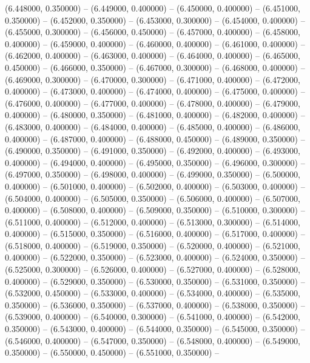 (6.448000, 0.350000) -- 
(6.449000, 0.400000) -- 
(6.450000, 0.400000) -- 
(6.451000, 0.350000) -- 
(6.452000, 0.350000) -- 
(6.453000, 0.300000) -- 
(6.454000, 0.400000) -- 
(6.455000, 0.300000) -- 
(6.456000, 0.450000) -- 
(6.457000, 0.400000) -- 
(6.458000, 0.400000) -- 
(6.459000, 0.400000) -- 
(6.460000, 0.400000) -- 
(6.461000, 0.400000) -- 
(6.462000, 0.400000) -- 
(6.463000, 0.400000) -- 
(6.464000, 0.400000) -- 
(6.465000, 0.450000) -- 
(6.466000, 0.350000) -- 
(6.467000, 0.300000) -- 
(6.468000, 0.400000) -- 
(6.469000, 0.300000) -- 
(6.470000, 0.300000) -- 
(6.471000, 0.400000) -- 
(6.472000, 0.400000) -- 
(6.473000, 0.400000) -- 
(6.474000, 0.400000) -- 
(6.475000, 0.400000) -- 
(6.476000, 0.400000) -- 
(6.477000, 0.400000) -- 
(6.478000, 0.400000) -- 
(6.479000, 0.400000) -- 
(6.480000, 0.350000) -- 
(6.481000, 0.400000) -- 
(6.482000, 0.400000) -- 
(6.483000, 0.400000) -- 
(6.484000, 0.400000) -- 
(6.485000, 0.400000) -- 
(6.486000, 0.400000) -- 
(6.487000, 0.400000) -- 
(6.488000, 0.450000) -- 
(6.489000, 0.350000) -- 
(6.490000, 0.350000) -- 
(6.491000, 0.350000) -- 
(6.492000, 0.400000) -- 
(6.493000, 0.400000) -- 
(6.494000, 0.400000) -- 
(6.495000, 0.350000) -- 
(6.496000, 0.300000) -- 
(6.497000, 0.350000) -- 
(6.498000, 0.400000) -- 
(6.499000, 0.350000) -- 
(6.500000, 0.400000) -- 
(6.501000, 0.400000) -- 
(6.502000, 0.400000) -- 
(6.503000, 0.400000) -- 
(6.504000, 0.400000) -- 
(6.505000, 0.350000) -- 
(6.506000, 0.400000) -- 
(6.507000, 0.400000) -- 
(6.508000, 0.400000) -- 
(6.509000, 0.350000) -- 
(6.510000, 0.300000) -- 
(6.511000, 0.400000) -- 
(6.512000, 0.400000) -- 
(6.513000, 0.300000) -- 
(6.514000, 0.400000) -- 
(6.515000, 0.350000) -- 
(6.516000, 0.400000) -- 
(6.517000, 0.400000) -- 
(6.518000, 0.400000) -- 
(6.519000, 0.350000) -- 
(6.520000, 0.400000) -- 
(6.521000, 0.400000) -- 
(6.522000, 0.350000) -- 
(6.523000, 0.400000) -- 
(6.524000, 0.350000) -- 
(6.525000, 0.300000) -- 
(6.526000, 0.400000) -- 
(6.527000, 0.400000) -- 
(6.528000, 0.400000) -- 
(6.529000, 0.350000) -- 
(6.530000, 0.350000) -- 
(6.531000, 0.350000) -- 
(6.532000, 0.450000) -- 
(6.533000, 0.400000) -- 
(6.534000, 0.400000) -- 
(6.535000, 0.350000) -- 
(6.536000, 0.350000) -- 
(6.537000, 0.400000) -- 
(6.538000, 0.350000) -- 
(6.539000, 0.400000) -- 
(6.540000, 0.300000) -- 
(6.541000, 0.400000) -- 
(6.542000, 0.350000) -- 
(6.543000, 0.400000) -- 
(6.544000, 0.350000) -- 
(6.545000, 0.350000) -- 
(6.546000, 0.400000) -- 
(6.547000, 0.350000) -- 
(6.548000, 0.400000) -- 
(6.549000, 0.350000) -- 
(6.550000, 0.450000) -- 
(6.551000, 0.350000) -- 
